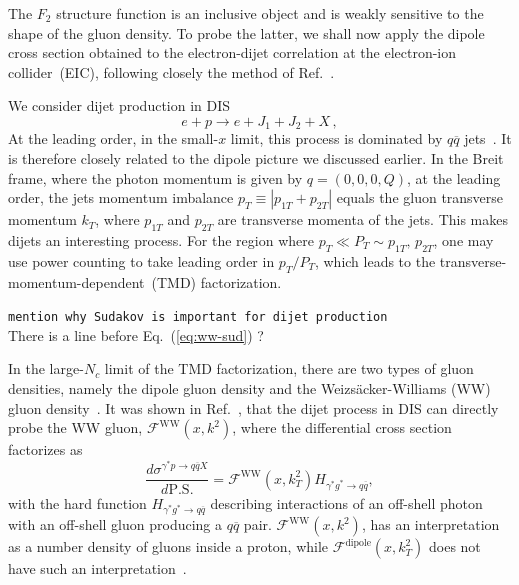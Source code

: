 \documentclass[11pt]{article}
\newcommand{\fww}[0]{\mathcal{F}^{\mathrm{WW}}}
\newcommand{\fdp}[0]{\mathcal{F}^{\mathrm{dipole}}}
\newcommand{\commentPending}[1]{\texttt{\color{red!25}#1}}
\begin{document}
The $F_2$ structure function is an inclusive object and is weakly sensitive to
the shape of the gluon density. To probe the latter, we shall now 
apply the dipole cross section obtained to the electron-dijet correlation at the
electron-ion collider~(EIC), following closely the method of
Ref.~\cite{vanHameren:2021sqc}.  

We consider dijet production in DIS
%
\begin{equation}
  e+p\rightarrow e+J_1+J_2+X\,,
\end{equation}
%
At the leading order, in the small-$x$ limit, this process is
dominated by $q\overline{q}$ jets~\cite{Dominguez:2011wm}.  It is
therefore closely related to the dipole picture we discussed earlier. In the Breit frame, where the photon momentum is
given by $q=(0,0,0,Q)$, at the leading order, the jets momentum imbalance
$p_T\equiv\left|p_{1T}+p_{2T}\right|$ equals the gluon transverse momentum
$k_T$, where $p_{1T}$ and $p_{2T}$ are transverse momenta of the jets.  This
makes dijets an interesting process. For the region where $p_T\ll P_T\sim
p_{1T},\,p_{2T}$, one may use power counting to take leading order in $p_T/P_T$,
which leads to the transverse-momentum-dependent~(TMD) factorization.
  
\commentPending{mention why Sudakov is important for dijet production}\\
{\color{blue} There is a line before Eq.~(\ref{eq:ww-sud}) ?}

In the large-$N_c$ limit of the TMD factorization, there are two types of gluon
densities, namely the dipole gluon density and the Weizs\"acker-Williams (WW)
gluon
density~\cite{Dominguez:2010xd,Dominguez:2011wm,vanHameren:2016ftb,Xiao:2017ggh}.
It was shown in Ref.~\cite{Dominguez:2011wm}, that the dijet process in DIS can
directly probe the WW gluon, $\fww(x,k^2)$, where the differential cross section
factorizes as
%
\begin{equation}
	\frac{d\sigma^{\gamma^*p\rightarrow q\overline{q}X}}{d \mathrm{P.S.}}=\fww(x,k_T^2)H_{\gamma^*g^*\rightarrow q\overline{q}},
        \label{eq:TMD}
\end{equation}
%
with the hard function $H_{\gamma^*g^*\rightarrow q\overline{q}}$ describing
interactions of an off-shell photon with an off-shell gluon producing a
$q\overline{q}$ pair.  $\fww(x,k^2)$, has an interpretation as a number density
of gluons inside a proton, while $\fdp(x,k_T^2)$ does not have such an
interpretation~\cite{Dominguez:2010xd,Dominguez:2011wm,Xiao:2017ggh}.  
\end{document}
